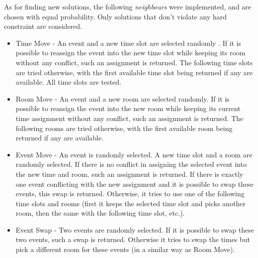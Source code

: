 \documentclass{llncs}
\begin{document}
As for finding new solutions, the following \textit{neighbours} were implemented, and are chosen with equal probability. Only solutions that don't violate any hard constraint are considered.
\begin{itemize}
\item Time Move - An event and a new time slot are selected randomly . If it is possible to reassign
the event into the new time slot while keeping its room without any conflict, such an assignment
is returned. The following time slots are tried otherwise, with the first available time
slot being returned if any are available. All time slots are tested.
\item Room Move - An event and a new room are selected randomly. If it is possible to reassign the
event into the new room while keeping its current time assignment without any conflict, such
an assignment is returned. The following rooms are tried otherwise, with the first available
room being returned if any are available.
\item Event Move - An event is randomly selected. A new time slot and a room are randomly selected.
If there is no conflict in assigning the selected event into the new time and room, such
an assignment is returned. If there is exactly one event conflicting with the new assignment
and it is possible to swap these events, this swap is returned. Otherwise, it tries to use one
of the following time slots and rooms (first it keeps the selected time slot and picks another
room, then the same with the following time slot, etc.).
\item Event Swap - Two events are randomly selected. If it is possible to swap these two events,
such a swap is returned. Otherwise it tries to swap the times but pick a different room for
these events (in a similar way as Room Move).
\end{itemize}
\end{document}
